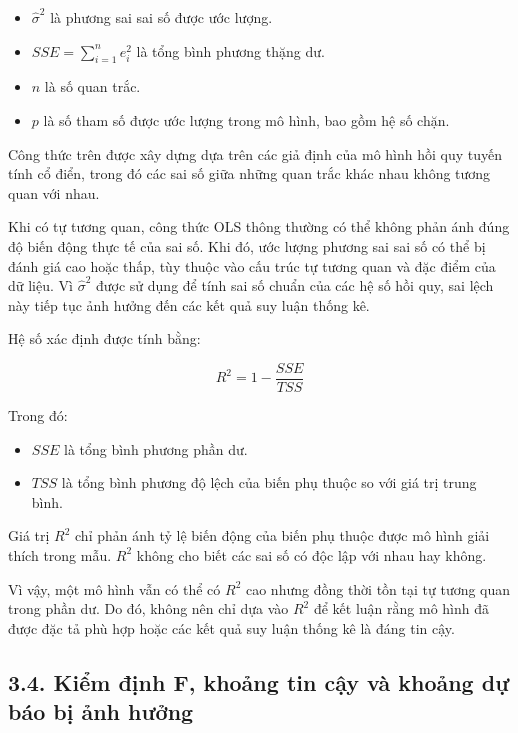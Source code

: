 \documentclass[12pt,a4paper]{article}
\begin{document}
\begin{itemize}
    \item $\hat{\sigma}^2$ là phương sai sai số được ước lượng.
    
    \item $SSE=\sum_{i=1}^{n}e_i^2$ là tổng bình phương thặng dư.
    
    \item $n$ là số quan trắc.
    
    \item $p$ là số tham số được ước lượng trong mô hình, bao gồm hệ số chặn.
\end{itemize}

Công thức trên được xây dựng dựa trên các giả định của mô hình hồi quy tuyến tính cổ điển, trong đó các sai số giữa những quan trắc khác nhau không tương quan với nhau.

Khi có tự tương quan, công thức OLS thông thường có thể không phản ánh đúng độ biến động thực tế của sai số. Khi đó, ước lượng phương sai sai số có thể bị đánh giá cao hoặc thấp, tùy thuộc vào cấu trúc tự tương quan và đặc điểm của dữ liệu. Vì $\hat{\sigma}^2$ được sử dụng để tính sai số chuẩn của các hệ số hồi quy, sai lệch này tiếp tục ảnh hưởng đến các kết quả suy luận thống kê.

Hệ số xác định được tính bằng:

\[
R^2
=
1-\frac{SSE}{TSS}
\]

Trong đó:

\begin{itemize}
    \item $SSE$ là tổng bình phương phần dư.
    
    \item $TSS$ là tổng bình phương độ lệch của biến phụ thuộc so với giá trị trung bình.
\end{itemize}

Giá trị $R^2$ chỉ phản ánh tỷ lệ biến động của biến phụ thuộc được mô hình giải thích trong mẫu. $R^2$ không cho biết các sai số có độc lập với nhau hay không.

Vì vậy, một mô hình vẫn có thể có $R^2$ cao nhưng đồng thời tồn tại tự tương quan trong phần dư. Do đó, không nên chỉ dựa vào $R^2$ để kết luận rằng mô hình đã được đặc tả phù hợp hoặc các kết quả suy luận thống kê là đáng tin cậy.


\subsection{3.4. Kiểm định F, khoảng tin cậy và khoảng dự báo bị ảnh hưởng}
\end{document}
